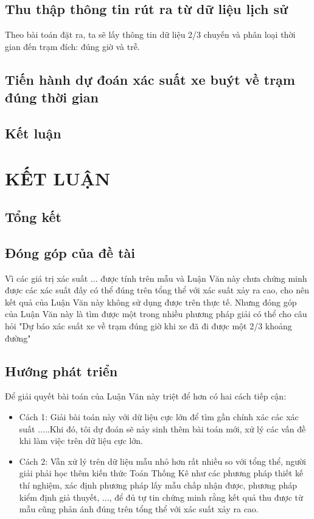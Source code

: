 \documentclass[a4paper, 13pt]{report}
\begin{document}
\section{Thu thập thông tin rút ra từ dữ liệu lịch sử}
Theo bài toán đặt ra, ta sẽ lấy thông tin dữ liệu 2/3 chuyến và phân loại thời gian đến trạm đích: đúng giờ và trễ.
\section{Tiến hành dự đoán xác suất xe buýt về trạm đúng thời gian}
\section{Kết luận}
\chapter{KẾT LUẬN}
\section{Tổng kết}
\section{Đóng góp của đề tài}
Vì các giá trị xác suất ... được tính trên mẫu và Luận Văn này chưa chứng minh được các xác suất đấy có thể đúng trên tổng thể với xác suất xảy ra cao, cho nên kết quả của Luận Văn này không sử dụng được trên thực tế. Nhưng đóng góp của Luận Văn này là tìm được một trong nhiều phương pháp giải có thể cho câu hỏi "Dự báo xác suất xe về trạm đúng giờ khi xe đã đi được một 2/3 khoảng đường"
\section{Hướng phát triển}
Để giải quyết bài toán của Luận Văn này triệt để hơn có hai cách tiếp cận:
\begin{itemize}
\item Cách 1: Giải bài toán này với dữ liệu cực lớn để tìm gần chính xác các xác suất .....Khi đó, tôi dự đoán sẽ nảy sinh thêm bài toán mới, xử lý các vấn đề khi làm việc trên dữ liệu cực lớn.
\item Cách 2: Vẫn xử lý trên dữ liệu mẫu nhỏ hơn rất nhiều so với tổng thể, người giải phải học thêm kiến thức Toán Thống Kê như các phương pháp thiết kế thí nghiệm, xác định phương pháp lấy mẫu chấp nhận được, phương pháp kiểm định giả thuyết, ..., để đủ tự tin chứng minh rằng kết quả thu được từ mẫu cũng phản ánh đúng trên tổng thể với xác suất xảy ra cao.
\end{itemize}
\pagebreak
\end{document}
